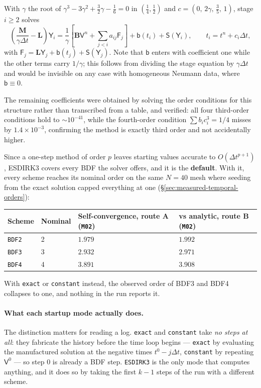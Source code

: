 \documentclass[11pt,a4paper]{article}
\newcommand{\code}[1]{\texttt{\small #1}}
\newcommand{\Mmass}{\mathbf{M}}
\newcommand{\Lop}{\mathbf{L}}
\newcommand{\Bimp}{\mathbf{B}}
\begin{document}
With $\gamma$ the root of $\gamma^3-3\gamma^2+\tfrac32\gamma-\tfrac16=0$ in
$(\tfrac14,\tfrac12)$ and $c=(0,\,2\gamma,\,\tfrac35,\,1)$, stage $i\ge2$ solves
\begin{equation}
  \left(\frac{\Mmass}{\gamma\Delta t}-\Lop\right)\mathsf{Y}_i
  =
  \frac{1}{\gamma}\left[\Bimp\mathsf{V}^{n}
  +\sum_{j<i}a_{ij}\mathsf{F}_j\right]
  +\mathsf{b}(t_i)+\mathsf{S}(\mathsf{Y}_i),
  \qquad
  t_i=t^n+c_i\Delta t,
  \label{eq:esdirk-stage}
\end{equation}
with $\mathsf{F}_j=\Lop\mathsf{Y}_j+\mathsf{b}(t_j)+\mathsf{S}(\mathsf{Y}_j)$.
Note that $\mathsf{b}$ enters with coefficient one while the other terms carry
$1/\gamma$; this follows from dividing the stage equation by $\gamma\Delta t$
and would be invisible on any case with homogeneous Neumann data, where
$\mathsf{b}\equiv0$.

The remaining coefficients were obtained by solving the order conditions for
this structure rather than transcribed from a table, and verified: all four
third-order conditions hold to $\sim10^{-41}$, while the fourth-order condition
$\sum b_ic_i^3=1/4$ misses by $1.4\times10^{-3}$, confirming the method is
exactly third order and not accidentally higher.

Since a one-step method of order $p$ leaves starting values accurate to
$O(\Delta t^{p+1})$, ESDIRK3 covers every BDF the solver offers, and it is the
\textbf{default}. With it, every scheme reaches its nominal order on the same
$N=40$ mesh where seeding from the exact solution capped everything at one
(\S\ref{sec:measured-temporal-orders}):
\begin{center}
\begin{tabular}{@{}llll@{}}
\toprule
Scheme & Nominal & Self-convergence, route A (\code{M02}) & vs analytic, route B (\code{M02}) \\
\midrule
\code{BDF2} & 2 & $1.979$ & $\mathbf{1.992}$ \\
\code{BDF3} & 3 & $2.932$ & $\mathbf{2.971}$ \\
\code{BDF4} & 4 & $3.891$ & $\mathbf{3.908}$ \\
\bottomrule
\end{tabular}
\end{center}
With \code{exact} or \code{constant} instead, the observed order of BDF3 and BDF4
collapses to one, and nothing in the run reports it.

\paragraph{What each startup mode actually does.} The distinction matters for
reading a log. \code{exact} and \code{constant} take \emph{no steps at all}:
they fabricate the history before the time loop begins --- \code{exact} by
evaluating the manufactured solution at the negative times $t^0-j\Delta t$,
\code{constant} by repeating $\mathsf{V}^0$ --- so step $0$ is already a BDF
step. \code{ESDIRK3} is the only mode that computes anything, and it does so by
taking the first $k-1$ steps of the run with a different scheme.
\end{document}
